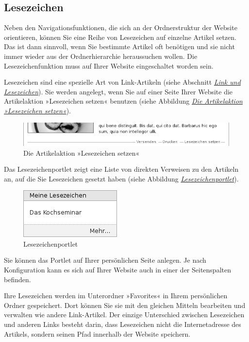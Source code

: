 \documentclass[a4paper,12pt,ngerman]{manual}
\begin{document}
\subsection{Lesezeichen}

Neben den Navigationsfunktionen, die sich an der Ordnerstruktur der Website
orientieren, können Sie eine Reihe von Lesezeichen auf einzelne Artikel
setzen. Das ist dann sinnvoll, wenn Sie bestimmte Artikel oft benötigen und
sie nicht immer wieder aus der Ordnerhierarchie heraussuchen wollen. Die
Lesezeichenfunktion muss auf Ihrer Website eingeschaltet worden sein.

Lesezeichen sind eine spezielle Art von Link-Artikeln (siehe
Abschnitt \hyperlink{sec-link}{\emph{Link und Lesezeichen}}). Sie werden angelegt, wenn Sie auf einer Seite
Ihrer Website die Artikelaktion »Lesezeichen setzen« benutzen (siehe
Abbildung \hyperlink{fig-lesezeichen-setzen}{\emph{Die Artikelaktion »Lesezeichen setzen«}}).
\hypertarget{fig-lesezeichen-setzen}{}\begin{figure}[htbp]
\centering

\includegraphics{lesezeichen-setzen.png}
\caption{Die Artikelaktion »Lesezeichen setzen«}\end{figure}

Das Lesezeichenportlet zeigt eine Liste von direkten Verweisen zu den
Artikeln an, auf die Sie Lesezeichen gesetzt haben (siehe Abbildung
\hyperlink{fig-portlet-favorites}{\emph{Lesezeichenportlet}}).
\hypertarget{fig-portlet-favorites}{}\begin{figure}[htbp]
\centering

\includegraphics{portlet-favorites.png}
\caption{Lesezeichenportlet}\end{figure}

Sie können das Portlet auf Ihrer persönlichen Seite anlegen. Je nach
Konfiguration kann es sich auf Ihrer Website auch in einer der
Seitenspalten befinden.

Ihre Lesezeichen werden im Unterordner »Favorites« in Ihrem persönlichen
Ordner gespeichert. Dort können Sie sie mit den gleichen Mitteln bearbeiten
und verwalten wie andere Link-Artikel. Der einzige Unterschied zwischen
Lesezeichen und anderen Links besteht darin, dass Lesezeichen nicht die
Internetadresse des Artikels, sondern seinen Pfad innerhalb der Website
speichern.
\end{document}
